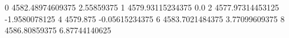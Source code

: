 0 4582.48974609375 2.55859375
1 4579.93115234375 0.0
2 4577.97314453125 -1.9580078125
4 4579.875 -0.05615234375
6 4583.7021484375 3.77099609375
8 4586.80859375 6.87744140625
